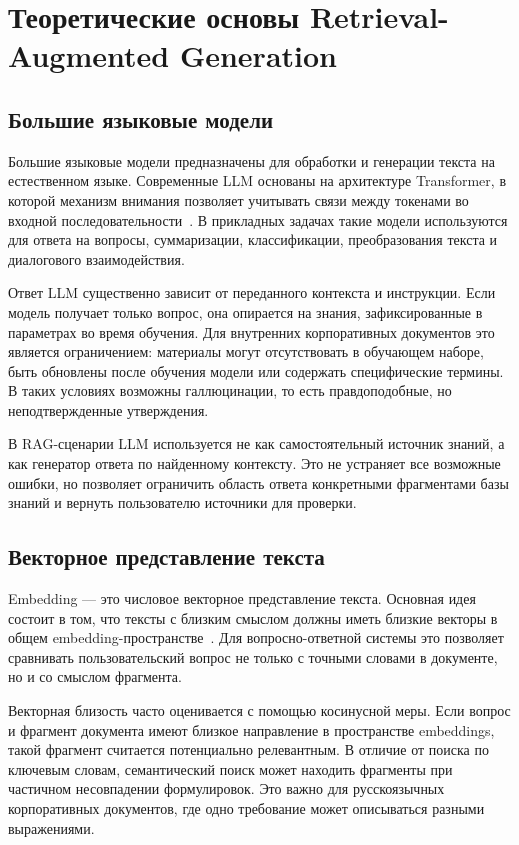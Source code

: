 \chapter{Теоретические основы Retrieval-Augmented Generation}
\label{chapter:theory}

\section{Большие языковые модели}

Большие языковые модели предназначены для обработки и генерации текста на естественном языке. Современные LLM основаны на архитектуре Transformer, в которой механизм внимания позволяет учитывать связи между токенами во входной последовательности~\cite{Vaswani2017Attention}. В прикладных задачах такие модели используются для ответа на вопросы, суммаризации, классификации, преобразования текста и диалогового взаимодействия.

Ответ LLM существенно зависит от переданного контекста и инструкции. Если модель получает только вопрос, она опирается на знания, зафиксированные в параметрах во время обучения. Для внутренних корпоративных документов это является ограничением: материалы могут отсутствовать в обучающем наборе, быть обновлены после обучения модели или содержать специфические термины. В таких условиях возможны галлюцинации, то есть правдоподобные, но неподтвержденные утверждения.

В RAG-сценарии LLM используется не как самостоятельный источник знаний, а как генератор ответа по найденному контексту. Это не устраняет все возможные ошибки, но позволяет ограничить область ответа конкретными фрагментами базы знаний и вернуть пользователю источники для проверки.

\section{Векторное представление текста}

Embedding — это числовое векторное представление текста. Основная идея состоит в том, что тексты с близким смыслом должны иметь близкие векторы в общем embedding-пространстве~\cite{Reimers2019SentenceBERT}. Для вопросно-ответной системы это позволяет сравнивать пользовательский вопрос не только с точными словами в документе, но и со смыслом фрагмента.

Векторная близость часто оценивается с помощью косинусной меры. Если вопрос и фрагмент документа имеют близкое направление в пространстве embeddings, такой фрагмент считается потенциально релевантным. В отличие от поиска по ключевым словам, семантический поиск может находить фрагменты при частичном несовпадении формулировок. Это важно для русскоязычных корпоративных документов, где одно требование может описываться разными выражениями.

